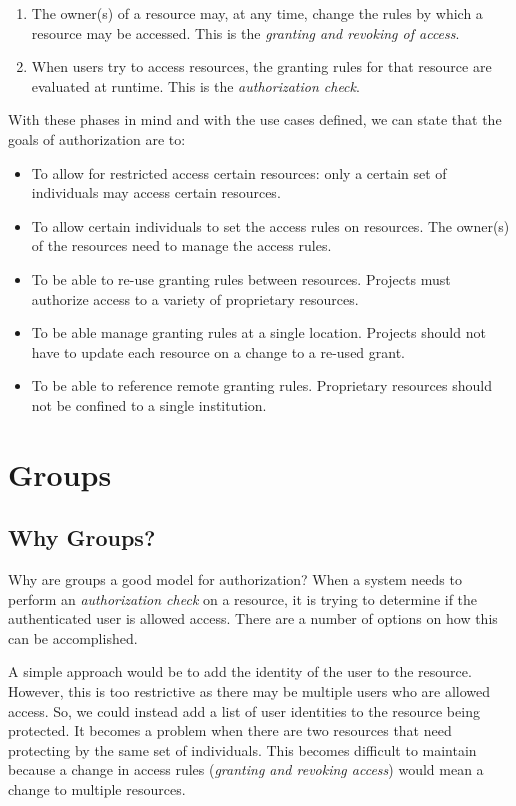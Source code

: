 \documentclass[11pt,a4paper]{ivoa}
\begin{document}
\begin{enumerate}
\item The owner(s) of a resource may, at any time, change the rules by which a resource may be accessed. This is the \emph{granting and revoking of access}.
\item When users try to access resources, the granting rules for that resource are evaluated at runtime. This is the \emph{authorization check}.
\end{enumerate}

With these phases in mind and with the use cases defined, we can state that the goals of authorization are to:

\begin{itemize}
\item To allow for restricted access certain resources: only a certain set of individuals may access certain resources.
\item To allow certain individuals to set the access rules on resources.  The owner(s) of the resources need to manage the access rules.
\item To be able to re-use granting rules between resources.  Projects must authorize access to a variety of proprietary resources.
\item To be able manage granting rules at a single location.  Projects should not have to update each resource on a change to a re-used grant.
\item To be able to reference remote granting rules.  Proprietary resources should not be confined to a single institution.
\end{itemize}

\section{Groups}

\subsection{Why Groups?}

Why are groups a good model for authorization?  When a system needs to perform an \emph{authorization check} on a resource, it is trying to determine if the authenticated user is allowed access.  There are a number of options on how this can be accomplished.

A simple approach would be to add the identity of the user to the resource.  However, this is too restrictive as there may be multiple users who are allowed access.  So, we could instead add a list of user identities to the resource being protected.  It becomes a problem when there are two resources that need protecting by the same set of individuals.  This becomes difficult to maintain because a change in access rules (\emph{granting and revoking access}) would mean a change to multiple resources.
\end{document}

